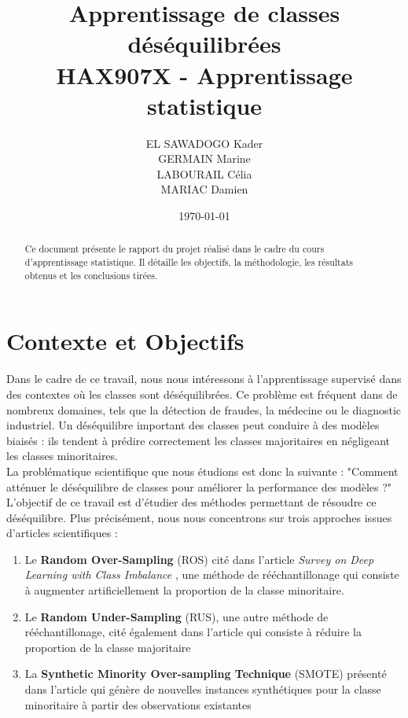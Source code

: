 \documentclass[a4paper,12pt]{article}
\title{
  \Huge\textbf{Apprentissage de classes déséquilibrées}\\
  \LARGE HAX907X - Apprentissage statistique
}
\author{
EL SAWADOGO Kader\\
GERMAIN Marine\\
LABOURAIL Célia\\
MARIAC Damien
}
\date{\today}
\begin{document}
\maketitle

\begin{abstract}
Ce document présente le rapport du projet réalisé dans le cadre du cours d'apprentissage statistique. Il détaille les objectifs, la méthodologie, les résultats obtenus et les conclusions tirées.
\end{abstract}


\tableofcontents

\newpage

\section{Contexte et Objectifs}

Dans le cadre de ce travail, nous nous intéressons à l’apprentissage supervisé dans des contextes où les classes sont déséquilibrées.
Ce problème est fréquent dans de nombreux domaines, tels que la détection de fraudes, la médecine ou le diagnostic industriel. Un déséquilibre important des classes peut conduire à des modèles biaisés : ils tendent à prédire correctement les classes majoritaires en négligeant les classes minoritaires.\\

La problématique scientifique que nous étudions est donc la suivante : "Comment atténuer le déséquilibre de classes pour améliorer la performance des modèles ?"\\

L’objectif de ce travail est d’étudier des méthodes permettant de résoudre ce déséquilibre. Plus précisément, nous nous concentrons sur trois approches issues d’articles scientifiques :
\begin{enumerate}
    \item Le \textbf{Random Over-Sampling} (ROS) cité dans l’article \textit{Survey on Deep Learning with Class Imbalance} \cite{johnson2019survey}, une méthode de rééchantillonage qui consiste à augmenter artificiellement la proportion de la classe minoritaire.
    \item Le \textbf{Random Under-Sampling} (RUS), une autre méthode de rééchantillonage,  cité également dans l’article \cite{johnson2019survey} qui consiste à réduire la proportion de la classe majoritaire
    \item La \textbf{Synthetic Minority Over-sampling Technique} (SMOTE) présenté dans l’article \cite{chawla2002smote} qui génère de nouvelles instances synthétiques pour la classe minoritaire à partir des observations existantes
\end{enumerate}
\end{document}
